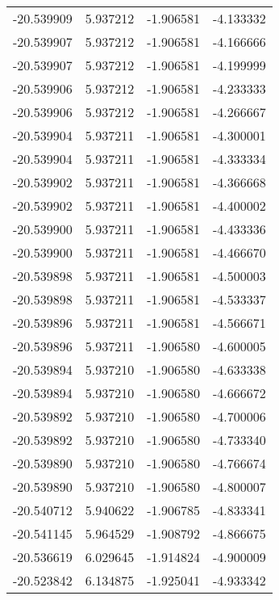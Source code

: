 \begin{tabular}{rrrr}
      -20.539909 &         5.937212 &   -1.906581 &  -4.133332 \\
      -20.539907 &         5.937212 &   -1.906581 &  -4.166666 \\
      -20.539907 &         5.937212 &   -1.906581 &  -4.199999 \\
      -20.539906 &         5.937212 &   -1.906581 &  -4.233333 \\
      -20.539906 &         5.937212 &   -1.906581 &  -4.266667 \\
      -20.539904 &         5.937211 &   -1.906581 &  -4.300001 \\
      -20.539904 &         5.937211 &   -1.906581 &  -4.333334 \\
      -20.539902 &         5.937211 &   -1.906581 &  -4.366668 \\
      -20.539902 &         5.937211 &   -1.906581 &  -4.400002 \\
      -20.539900 &         5.937211 &   -1.906581 &  -4.433336 \\
      -20.539900 &         5.937211 &   -1.906581 &  -4.466670 \\
      -20.539898 &         5.937211 &   -1.906581 &  -4.500003 \\
      -20.539898 &         5.937211 &   -1.906581 &  -4.533337 \\
      -20.539896 &         5.937211 &   -1.906581 &  -4.566671 \\
      -20.539896 &         5.937211 &   -1.906580 &  -4.600005 \\
      -20.539894 &         5.937210 &   -1.906580 &  -4.633338 \\
      -20.539894 &         5.937210 &   -1.906580 &  -4.666672 \\
      -20.539892 &         5.937210 &   -1.906580 &  -4.700006 \\
      -20.539892 &         5.937210 &   -1.906580 &  -4.733340 \\
      -20.539890 &         5.937210 &   -1.906580 &  -4.766674 \\
      -20.539890 &         5.937210 &   -1.906580 &  -4.800007 \\
      -20.540712 &         5.940622 &   -1.906785 &  -4.833341 \\
      -20.541145 &         5.964529 &   -1.908792 &  -4.866675 \\
      -20.536619 &         6.029645 &   -1.914824 &  -4.900009 \\
      -20.523842 &         6.134875 &   -1.925041 &  -4.933342 \\

\end{tabular}
